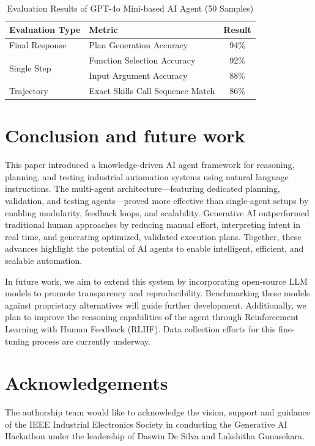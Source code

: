 \documentclass[conference]{IEEEtran}
\begin{document}
\begin{table}[ht]
\centering
\caption{Evaluation Results of GPT-4o Mini-based AI Agent (50 Samples)}
\begin{tabular}{|l|l|c|}
\hline
\textbf{Evaluation Type} & \textbf{Metric} & \textbf{Result} \\
\hline
\multirow{1}{*}{Final Response} 
    &  Plan Generation Accuracy & 94\%  \\
\hline
\multirow{2}{*}{Single Step} 
    & Function Selection Accuracy & 92\% \\
    & Input Argument Accuracy & 88\% \\
\hline
\multirow{1}{*}{Trajectory} 
    & Exact Skills Call Sequence Match & 86\% \\

\hline
\end{tabular}
\label{tab:evaluation_results}
\end{table}



\section{Conclusion and future work}
\label{sec:conclusion}

This paper introduced a knowledge-driven AI agent framework for reasoning, planning, and testing industrial automation systems using natural language instructions. The multi-agent architecture—featuring dedicated planning, validation, and testing agents—proved more effective than single-agent setups by enabling modularity, feedback loops, and scalability. Generative AI outperformed traditional human approaches by reducing manual effort, interpreting intent in real time, and generating optimized, validated execution plans. Together, these advances highlight the potential of AI agents to enable intelligent, efficient, and scalable automation.


In future work, we aim to extend this system by incorporating open-source LLM models to promote transparency and reproducibility. Benchmarking these models against proprietary alternatives will guide further development. Additionally, we plan to improve the reasoning capabilities of the agent through Reinforcement Learning with Human Feedback (RLHF). Data collection efforts for this fine-tuning process are currently underway.

\section{Acknowledgements}
The authorship team would like to acknowledge the vision, support and guidance of the IEEE Industrial Electronics Society in conducting the Generative AI Hackathon under the leadership of Daswin De Silva and Lakshitha Gunasekara.



\end{document}
